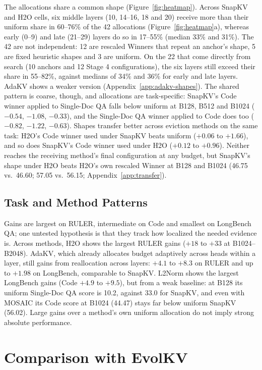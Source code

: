 \documentclass[11pt]{article}
\begin{document}
The allocations share a common shape (Figure~\ref{fig:heatmap}). Across SnapKV and H2O cells, six middle layers (10, 14--16, 18 and 20) receive more than their uniform share in 60--76\% of the 42 allocations (Figure~\ref{fig:heatmap}a), whereas early (0--9) and late (21--29) layers do so in 17--55\% (median 33\% and 31\%). The 42 are not independent: 12 are rescaled Winners that repeat an anchor's shape, 5 are fixed heuristic shapes and 3 are uniform. On the 22 that come directly from search (10 anchors and 12 Stage 4 configurations), the six layers still exceed their share in 55--82\%, against medians of 34\% and 36\% for early and late layers. AdaKV shows a weaker version (Appendix~\ref{app:adakv-shapes}). The shared pattern is coarse, though, and allocations are task-specific: SnapKV's Code winner applied to Single-Doc QA falls below uniform at B128, B512 and B1024 ($-0.54$, $-1.08$, $-0.33$), and the Single-Doc QA winner applied to Code does too ($-0.82$, $-1.22$, $-0.63$). Shapes transfer better across eviction methods on the same task: H2O's Code winner used under SnapKV beats uniform ($+0.06$ to $+1.66$), and so does SnapKV's Code winner used under H2O ($+0.12$ to $+0.96$). Neither reaches the receiving method's final configuration at any budget, but SnapKV's shape under H2O beats H2O's own rescaled Winner at B128 and B1024 (46.75 vs.\ 46.60; 57.05 vs.\ 56.15; Appendix~\ref{app:transfer}).

\subsection{Task and Method Patterns}

Gains are largest on RULER, intermediate on Code and smallest on LongBench QA; one untested hypothesis is that they track how localized the needed evidence is. Across methods, H2O shows the largest RULER gains ($+18$ to $+33$ at B1024--B2048). AdaKV, which already allocates budget adaptively across heads within a layer, still gains from reallocation across layers: $+4.1$ to $+8.3$ on RULER and up to $+1.98$ on LongBench, comparable to SnapKV. L2Norm shows the largest LongBench gains (Code $+4.9$ to $+9.5$), but from a weak baseline: at B128 its uniform Single-Doc QA score is 10.2, against 33.0 for SnapKV, and even with MOSAIC its Code score at B1024 (44.47) stays far below uniform SnapKV (56.02). Large gains over a method's own uniform allocation do not imply strong absolute performance.

\section{Comparison with EvolKV}
\label{sec:evolkv}
\end{document}
